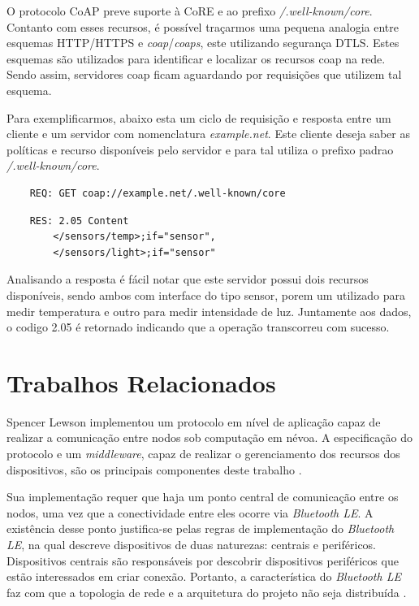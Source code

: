 O protocolo CoAP preve suporte à CoRE e ao prefixo \textit{/.well-known/core}. Contanto com esses recursos, é possível traçarmos uma pequena analogia entre
esquemas HTTP/HTTPS e \textit{coap}/\textit{coaps}, este utilizando segurança DTLS.
Estes esquemas são utilizados para identificar e localizar os recursos coap na rede.
Sendo assim, servidores coap ficam aguardando por requisições que utilizem tal esquema.

Para exemplificarmos, abaixo esta um ciclo de requisição e resposta entre um cliente e um servidor com nomenclatura \textit{example.net}.
Este cliente deseja saber as políticas e recurso disponíveis pelo servidor e para tal utiliza o prefixo padrao \textit{/.well-known/core}.

\begin{verbatim}
    REQ: GET coap://example.net/.well-known/core
\end{verbatim}

\begin{verbatim}
    RES: 2.05 Content
        </sensors/temp>;if="sensor",
        </sensors/light>;if="sensor"
\end{verbatim}


Analisando a resposta é fácil notar que este servidor possui dois recursos disponíveis,
sendo ambos com interface do tipo sensor, porem um utilizado para medir temperatura e outro para medir intensidade de luz.
Juntamente aos dados, o codigo 2.05 é retornado indicando que a operação transcorreu com sucesso.


\section{Trabalhos Relacionados}


Spencer Lewson implementou um protocolo em nível de aplicação \cite{tanenbaum2011redes} capaz de realizar a comunicação entre nodos sob computação em névoa.
A especificação do protocolo e um \textit{middleware}, capaz de realizar o gerenciamento dos recursos dos dispositivos, são os principais componentes deste trabalho \cite{Spencer:2015}.

Sua implementação requer que haja um ponto central de comunicação entre os nodos, uma vez que a conectividade entre eles ocorre via \textit{Bluetooth LE}.
A existência desse ponto justifica-se pelas regras de implementação do \textit{Bluetooth LE}, na qual descreve dispositivos de duas naturezas: centrais e periféricos.
Dispositivos centrais são responsáveis por descobrir dispositivos periféricos que estão interessados em criar conexão.
Portanto, a característica do \textit{Bluetooth LE} faz com que a topologia de rede e a arquitetura do projeto não seja distribuída \cite{Spencer:2015}.








